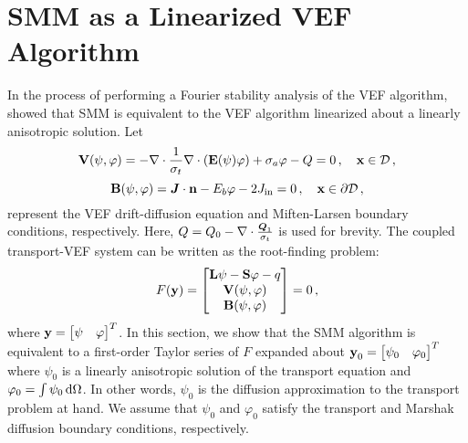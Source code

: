 \documentclass[../doc.tex]{subfiles}
\begin{document}
\section{SMM as a Linearized VEF Algorithm} \label{moment_sec:linearize}
In the process of performing a Fourier stability analysis of the VEF algorithm, \textcite{cefus} showed that SMM is equivalent to the VEF algorithm linearized about a linearly anisotropic solution. Let 
	\begin{equation}
		\boldsymbol{\mathrm{V}}(\psi,\varphi) = -\nabla\cdot\frac{1}{\sigma_t}\nabla\cdot\left( \boldsymbol{\mathrm{E}}(\psi)\varphi \right) + \sigma_a \varphi - Q = 0 \,, \quad \boldsymbol{\mathrm{x}} \in \mathcal{D} \,,
	\end{equation}
	\begin{equation}
		\boldsymbol{\mathrm{B}}(\psi,\varphi) = \boldsymbol{J}\cdot\boldsymbol{\mathrm{n}} - E_b \varphi - 2J_\text{in} = 0 \,, \quad \boldsymbol{\mathrm{x}} \in \partial\mathcal{D} \,,
	\end{equation}
represent the VEF drift-diffusion equation and Miften-Larsen boundary conditions, respectively. Here, $Q = Q_0 - \nabla\cdot\frac{\boldsymbol{Q}_1}{\sigma_t}$ is used for brevity. The coupled transport-VEF system can be written as the root-finding problem: 
	\begin{equation} \label{moment:vef_root}
		F(\boldsymbol{\mathrm{y}}) = \begin{bmatrix} 
			\boldsymbol{\mathrm{L}}\psi - \boldsymbol{\mathrm{S}}\varphi - q \\ 
			\boldsymbol{\mathrm{V}}(\psi,\varphi) \\ 
			\boldsymbol{\mathrm{B}}(\psi,\varphi)
		\end{bmatrix}
		= 0 \,, 
	\end{equation}
where $\boldsymbol{\mathrm{y}} = \begin{bmatrix} \psi & \varphi \end{bmatrix}^T$. In this section, we show that the SMM algorithm is equivalent to a first-order Taylor series of $F$ expanded about $\boldsymbol{\mathrm{y}}_0 = \begin{bmatrix} \psi_0 & \varphi_0 \end{bmatrix}^T$ where $\psi_0$ is a linearly anisotropic solution of the transport equation and $\varphi_0 = \int \psi_0 \mathop{}\!\mathrm{d} \Omega$. In other words, $\psi_0$ is the diffusion approximation to the transport problem at hand. We assume that $\psi_0$ and $\varphi_0$ satisfy the transport and Marshak diffusion boundary conditions, respectively. 
\end{document}
